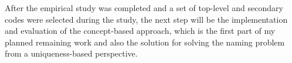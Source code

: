 
After the empirical study was completed and a set of top-level and secondary codes were selected during the study, the next step will be the implementation and evaluation of the concept-based approach, which is the first part of my planned remaining work and also the solution for solving the naming problem from a uniqueness-based perspective.

